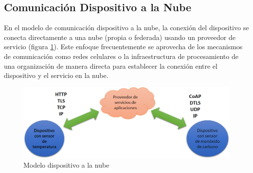   
\subsection{Comunicación Dispositivo a la Nube}
En el modelo de comunicación dispositivo a la nube, la conexión del dispositivo se conecta directamente a una nube (propia o federada) usando un proveedor de servicio (figura \ref{fig:d2n}). Este enfoque frecuentemente se aprovecha de los mecanismos de comunicación como redes celulares o la infraestructura de procesamiento de una  organización de manera directa para establecer la conexión entre el dispositivo y el servicio en la nube.
\begin{figure}[htb]
\centering
\includegraphics[scale=0.4]{./Figuras/d2n.png}
\caption{Modelo dispositivo a la nube}
\label{fig:d2n}
\vspace*{-10pt}
\end{figure}

